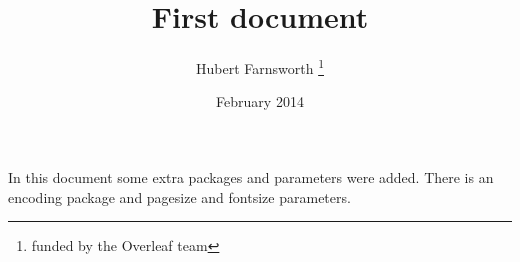 \documentclass[14pt, letterpaper, twoside]{article}
\title{First document}
\author{Hubert Farnsworth \thanks{funded by the Overleaf team}}
\date{February 2014}
\begin{document}
	
	\begin{titlepage}
		\maketitle
	\end{titlepage}
	
	In this document some extra packages and parameters
	were added. There is an encoding package
	and pagesize and fontsize parameters.
	
\end{document}
